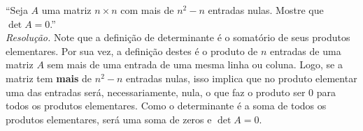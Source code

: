 \enquote{Seja $A$ uma matriz $n \times n$ com mais de $n^2 - n$ entradas nulas. Mostre que $\det A = 0$.} \\
\emph{Resolução.} Note que a definição de determinante é o somatório de seus produtos elementares. Por sua vez, a definição destes é o produto de $n$ entradas de uma matriz $A$ sem mais de uma entrada de uma mesma linha ou coluna. Logo, se a matriz tem \textbf{mais} de $n^2 - n$ entradas nulas, isso implica que no produto elementar uma das entradas será, necessariamente, nula, o que faz o produto ser 0 para todos os produtos elementares. Como o determinante é a soma de todos os produtos elementares, será uma soma de zeros e $\det A = 0$.